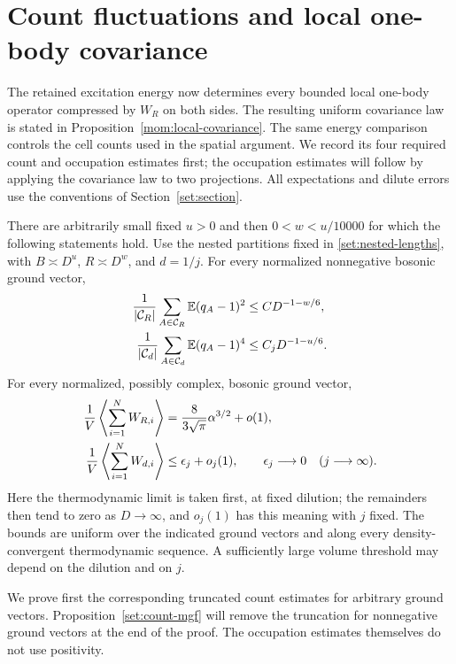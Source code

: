 \section{Count fluctuations and local one-body covariance}\label{en:consequences}

The retained excitation energy now determines every bounded local
one-body operator compressed by $W_R$ on both sides.
The resulting uniform covariance law is stated in
Proposition~\ref{mom:local-covariance}.  The same energy comparison
controls the cell counts used in the spatial argument.  We record its
four required count and occupation estimates first; the occupation
estimates will follow by applying the covariance law to two projections.
All expectations and dilute errors use the conventions of
Section~\ref{set:section}.

\begin{proposition}\label{en:energy-outputs}
There are arbitrarily small fixed $u>0$ and then $0<w<u/10000$ for which
the following statements hold.  Use the nested partitions fixed in
\eqref{set:nested-lengths}, with $B\asymp D^u$, $R\asymp D^w$, and
$d=1/j$.  For every normalized
nonnegative bosonic ground vector,
\begin{align}
 \frac1{|\mathcal C_R|}\sum_{A\in\mathcal C_R}
       \mathbb E(q_A-1)^2&\le C D^{-1-w/6},\label{en:R-count}\\
 \frac1{|\mathcal C_d|}\sum_{A\in\mathcal C_d}
       \mathbb E(q_A-1)^4&\le C_jD^{-1-u/6}.\label{en:d-count}
\end{align}
For every normalized, possibly complex, bosonic ground vector,
\begin{align}
 \frac1V\left\langle\sum_{i=1}^N W_{R,i}\right\rangle
       &=\frac{8}{3\sqrt\pi}\alpha^{3/2}+o(1),\label{en:R-occupation}\\
 \frac1V\left\langle\sum_{i=1}^N W_{d,i}\right\rangle
       &\le \epsilon_j+o_j(1),\qquad \epsilon_j\longrightarrow0
                \quad(j\longrightarrow\infty).\label{en:d-occupation}
\end{align}
Here the thermodynamic limit is taken first, at fixed dilution; the
remainders then tend to zero as $D\to\infty$, and $o_j(1)$ has this meaning
with $j$ fixed.  The bounds are uniform over the indicated ground vectors
and along every density-convergent thermodynamic sequence.  A sufficiently
large volume threshold may depend on the dilution and on $j$.
\end{proposition}

We prove first the corresponding truncated count estimates for arbitrary
ground vectors.  Proposition~\ref{set:count-mgf} will remove the truncation
for nonnegative ground vectors at the end of the proof.  The occupation
estimates themselves do not use positivity.

